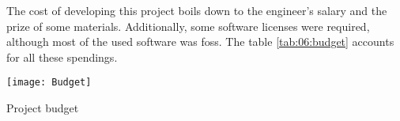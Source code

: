 \documentclass[../main.tex]{subfiles}
\begin{document}
\label{chap:budget}

The cost of developing this project boils down to the engineer's salary and the prize of some materials. Additionally, some software licenses were required, although most of the used software was \gls{foss}. The table \ref{tab:06:budget} accounts for all these spendings.\newline

\begin{table}[htbp]
    \centering
    \texttt{[image: Budget]}

    \caption{Project budget}
    \label{tab:06:budget}
\end{table}

\end{document}

